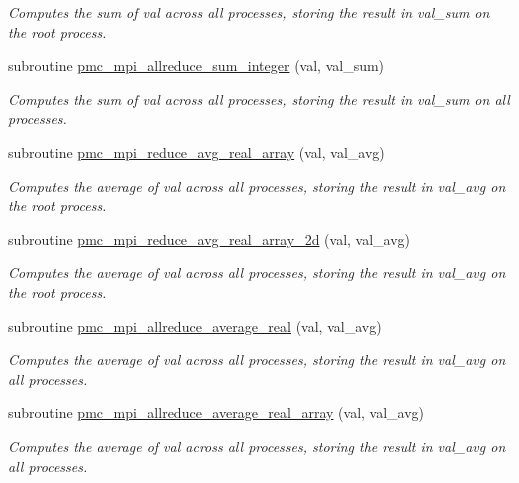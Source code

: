 \begin{DoxyCompactItemize}
\begin{DoxyCompactList}\small\item\em Computes the sum of {\ttfamily val} across all processes, storing the result in {\ttfamily val\+\_\+sum} on the root process. \end{DoxyCompactList}\item 
subroutine \mbox{\hyperlink{namespacepmc__mpi_ac35b8fc7f2c6fffbd92b4e655f31855c}{pmc\+\_\+mpi\+\_\+allreduce\+\_\+sum\+\_\+integer}} (val, val\+\_\+sum)
\begin{DoxyCompactList}\small\item\em Computes the sum of {\ttfamily val} across all processes, storing the result in {\ttfamily val\+\_\+sum} on all processes. \end{DoxyCompactList}\item 
subroutine \mbox{\hyperlink{namespacepmc__mpi_a65e8bc531122712336e66a245ee62665}{pmc\+\_\+mpi\+\_\+reduce\+\_\+avg\+\_\+real\+\_\+array}} (val, val\+\_\+avg)
\begin{DoxyCompactList}\small\item\em Computes the average of val across all processes, storing the result in val\+\_\+avg on the root process. \end{DoxyCompactList}\item 
subroutine \mbox{\hyperlink{namespacepmc__mpi_aaf6103345beb31b7d1a7dfa8c4f6e9a3}{pmc\+\_\+mpi\+\_\+reduce\+\_\+avg\+\_\+real\+\_\+array\+\_\+2d}} (val, val\+\_\+avg)
\begin{DoxyCompactList}\small\item\em Computes the average of val across all processes, storing the result in val\+\_\+avg on the root process. \end{DoxyCompactList}\item 
subroutine \mbox{\hyperlink{namespacepmc__mpi_af48bdae1028cee45478e96081514009c}{pmc\+\_\+mpi\+\_\+allreduce\+\_\+average\+\_\+real}} (val, val\+\_\+avg)
\begin{DoxyCompactList}\small\item\em Computes the average of val across all processes, storing the result in val\+\_\+avg on all processes. \end{DoxyCompactList}\item 
subroutine \mbox{\hyperlink{namespacepmc__mpi_aa8adfc668b04490ada770354659fdc4c}{pmc\+\_\+mpi\+\_\+allreduce\+\_\+average\+\_\+real\+\_\+array}} (val, val\+\_\+avg)
\begin{DoxyCompactList}\small\item\em Computes the average of val across all processes, storing the result in val\+\_\+avg on all processes. \end{DoxyCompactList}\item 

\end{DoxyCompactItemize}
